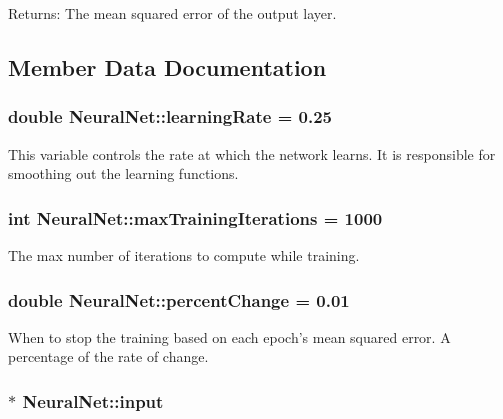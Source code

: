 \begin{Desc}
\item[Returns:]The mean squared error of the output layer. \end{Desc}


\subsection{Member Data Documentation}
\hypertarget{classNeuralNet_dbc3025a07c81b26fddcc6f376f69cd1}{
\subsubsection{\setlength{\rightskip}{0pt plus 5cm}double {\bf NeuralNet::learningRate} = 0.25}}
\label{classNeuralNet_dbc3025a07c81b26fddcc6f376f69cd1}


This variable controls the rate at which the network learns. It is responsible for smoothing out the learning functions. \hypertarget{classNeuralNet_48dd706c84da839dca865eae8cdffc5e}{
\subsubsection{\setlength{\rightskip}{0pt plus 5cm}int {\bf NeuralNet::maxTrainingIterations} = 1000}}
\label{classNeuralNet_48dd706c84da839dca865eae8cdffc5e}


The max number of iterations to compute while training. \hypertarget{classNeuralNet_a8329b04a9c709b1b508b06dbec234bd}{
\subsubsection{\setlength{\rightskip}{0pt plus 5cm}double {\bf NeuralNet::percentChange} = 0.01}}
\label{classNeuralNet_a8329b04a9c709b1b508b06dbec234bd}


When to stop the training based on each epoch's mean squared error. A percentage of the rate of change. \hypertarget{classNeuralNet_a254ed58d525fb163fe78e8ad2013d5e}{
\subsubsection{$\ast$ {\bf NeuralNet::input}}}
\label{classNeuralNet_a254ed58d525fb163fe78e8ad2013d5e}


